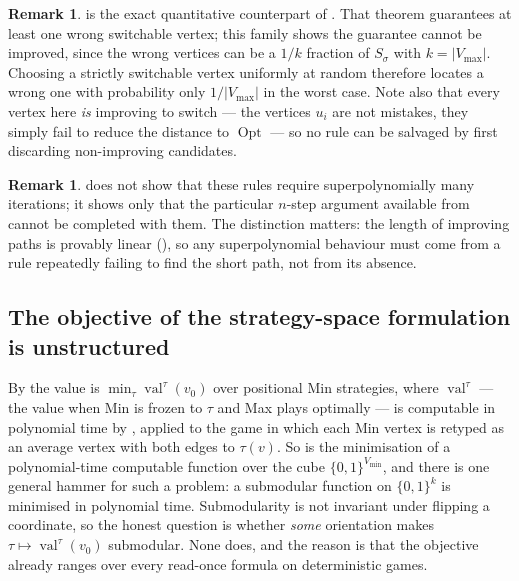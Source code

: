 \documentclass[11pt]{article}
\theoremstyle{plain}
\theoremstyle{definition}
\newtheorem{remark}[theorem]{Remark}
\DeclareMathOperator{\val}{val}
\DeclareMathOperator{\Opt}{Opt}
\newcommand{\Vmax}{V_{\max}}
\newcommand{\Vmin}{V_{\min}}
\begin{document}
\begin{remark}
 is the exact quantitative counterpart of
. That theorem guarantees at least one wrong
switchable vertex; this family shows the guarantee cannot be improved,
since the wrong vertices can be a $1/k$ fraction of $S_\sigma$ with
$k=|\Vmax|$. Choosing a strictly switchable vertex uniformly at random
therefore locates a wrong one with probability only $1/|\Vmax|$ in the
worst case. Note also that every vertex here \emph{is} improving to
switch --- the vertices $u_i$ are not mistakes, they simply fail to reduce
the distance to $\Opt$ --- so no rule can be salvaged by first discarding
non-improving candidates.
\end{remark}

\begin{remark}
 does not show that these rules require
superpolynomially many iterations; it shows only that the particular
$n$-step argument available from  cannot be
completed with them. The distinction matters: the length of improving
paths is provably linear (), so any superpolynomial
behaviour must come from a rule repeatedly failing to find the short
path, not from its absence.
\end{remark}

\subsection{The objective of the strategy-space formulation is
unstructured}\label{sec:submodular}

By  the value is $\min_{\tau}\val^{\tau}(v_0)$ over
positional Min strategies, where $\val^{\tau}$ --- the value when Min is frozen
to $\tau$ and Max plays optimally --- is computable in polynomial time by
, applied to the game in which each Min vertex is retyped
as an average vertex with both edges to $\tau(v)$. So  is the
minimisation of a polynomial-time computable function over the cube
$\{0,1\}^{\Vmin}$, and there is one general hammer for such a problem:
a submodular function on $\{0,1\}^{k}$ is minimised in polynomial time.
Submodularity is not invariant under flipping a coordinate, so the honest
question is whether \emph{some} orientation makes
$\tau\mapsto\val^{\tau}(v_0)$ submodular. None does, and the reason is that the
objective already ranges over every read-once formula on deterministic games.
\end{document}
